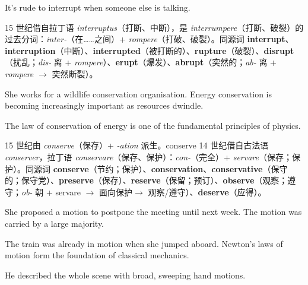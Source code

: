 \documentclass[../main.tex]{subfiles}
\begin{document}
{It's rude to interrupt when someone else is talking.}

\begin{origin}
15 世纪借自拉丁语 \textit{interruptus}（打断、中断），是 \textit{interrumpere}（打断、破裂）的过去分词：\textit{inter-}（在……之间）+ \textit{rompere}（打破、破裂）。同源词 \textbf{interrupt}、\textbf{interruption}（中断）、\textbf{interrupted}（被打断的）、\textbf{rupture}（破裂）、\textbf{disrupt}（扰乱；\textit{dis-} 离 + \textit{rompere}）、\textbf{erupt}（爆发）、\textbf{abrupt}（突然的；\textit{ab-} 离 + \textit{rompere} $\to$ 突然断裂）。
\end{origin}


{She works for a wildlife conservation organisation.}
{Energy conservation is becoming increasingly important as resources dwindle.}

{The law of conservation of energy is one of the fundamental principles of physics.}

\begin{origin}
15 世纪由 \textit{conserve}（保存）+ \textit{-ation} 派生。conserve 14 世纪借自古法语 \textit{conserver}，拉丁语 \textit{conservare}（保存、保护）：\textit{con-}（完全）+ \textit{servare}（保存；保护）。同源词 \textbf{conserve}（节约；保护）、\textbf{conservation}、\textbf{conservative}（保守的；保守党）、\textbf{preserve}（保存）、\textbf{reserve}（保留；预订）、\textbf{observe}（观察；遵守；\textit{ob-} 朝 + servare $\to$ 面向保护$\to$ 观察/遵守）、\textbf{deserve}（应得）。
\end{origin}


{She proposed a motion to postpone the meeting until next week.}
{The motion was carried by a large majority.}

{The train was already in motion when she jumped aboard.}
{Newton's laws of motion form the foundation of classical mechanics.}

{He described the whole scene with broad, sweeping hand motions.}
\end{document}
